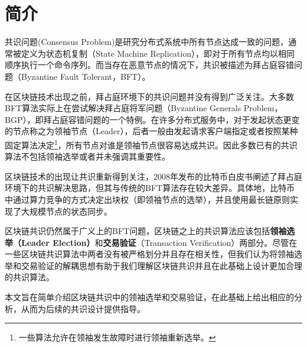 \section{简介}
共识问题(Consensus Problem)是研究分布式系统中所有节点达成一致的问题，通常被定义为状态机复制（State Machine Replication），即对于所有节点均以相同顺序执行一个命令序列。而当存在恶意节点的情况下，共识被描述为拜占庭容错问题（Byzantine Fault Tolerant，BFT）\cite{pease1980reaching}。

在区块链技术出现之前，拜占庭环境下的共识问题并没有得到广泛关注。大多数BFT算法实际上在尝试解决拜占庭将军问题（Byzantine Generals Problem，BGP）\cite{lamport1982byzantine}，即拜占庭容错问题的一个特例。在许多分布式服务中，对于发起状态更变的节点称之为领袖节点（Leader），后者一般由发起请求客户端指定或者按照某种固定算法决定\footnote{一些算法允许在领袖发生故障时进行领袖重新选举。}，所有节点对谁是领袖节点很容易达成共识。因此多数已有的共识算法不包括领袖选举或者并未强调其重要性。


区块链技术的出现让共识重新得到关注，2008年发布的比特币白皮书\cite{nakamoto2008bitcoin}阐述了拜占庭环境下的共识解决思路，但其与传统的BFT算法存在较大差异。具体地，比特币中通过算力竞争的方式决定出块权（即领袖节点的选举），并且使用最长链原则实现了大规模节点的状态同步。

区块链共识仍然属于广义上的BFT问题，区块链之上的共识算法应该包括\textbf{领袖选举（Leader Election）}和\textbf{交易验证}（Transaction Verification）两部分\cite{eyal2016bitcoin,kogias2016enhancing}。尽管在一些区块链共识算法中两者没有被严格划分并且存在相关性\cite{gilad2017algorand}，但我们认为将领袖选举和交易验证的解耦思想有助于我们理解区块链共识并且在此基础上设计更加合理的共识算法。

本文旨在简单介绍区块链共识中的领袖选举和交易验证，在此基础上给出相应的分析，从而为后续的共识设计提供指导。


